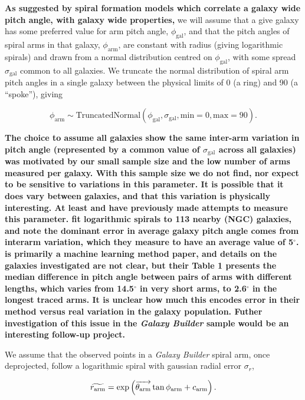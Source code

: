 \textbf{As suggested by spiral formation models which correlate a galaxy wide pitch angle, with galaxy wide properties,} we will assume that a give galaxy has some preferred value for arm pitch angle, $\phi_\mathrm{gal}$, and that the pitch angles of spiral arms in that galaxy, $\phi_\mathrm{arm}$, are constant with radius (giving logarithmic spirals) and drawn from a normal distribution centred on $\phi_\mathrm{gal}$, with some spread $\sigma_\mathrm{gal}$ common to all galaxies. We truncate the normal distribution of spiral arm pitch angles in a single galaxy between the physical limits of {0\degree} (a ring) and {90\degree} (a ``spoke''), giving

\begin{equation}
\phi_\mathrm{arm} \sim \mathrm{TruncatedNormal}(\phi_\mathrm{gal}, \sigma_\mathrm{gal}, \mathrm{min}=0, \mathrm{max}=90).
\end{equation}

\textbf{The choice to assume all galaxies show the same inter-arm variation in pitch angle (represented by a common value of $\sigma_\mathrm{gal}$ across all galaxies) was motivated by our small sample size and the low number of arms measured per galaxy. With this sample size we do not find, nor expect to be sensitive to variations in this parameter. It is possible that it does vary between galaxies, and that this variation is physically interesting. At least \citet{1981AJ.....86.1847K} and \citet{2014ApJ...790...87D} have previously made attempts to measure this parameter.  \citet{1981AJ.....86.1847K} fit logarithmic spirals to 113 nearby (NGC) galaxies, and note the dominant error in average galaxy pitch angle comes from interarm variation, which they measure to have an average value of 5$^\circ$. \citet{2014ApJ...790...87D} is primarily a machine learning method paper, and details on the galaxies investigated are not clear, but their Table 1 presents the median difference in pitch angle between pairs of arms with different lengths, which varies from 14.5$^\circ$ in very short arms, to 2.6$^\circ$ in the longest traced arms. It is unclear how much this encodes error in their method versus real variation in the galaxy population. Futher investigation of this issue in the \textit{Galaxy Builder} sample would be an interesting follow-up project.}

We assume that the observed points in a \textit{Galaxy Builder} spiral arm, once deprojected, follow a logarithmic spiral with gaussian radial error $\sigma_r$,

\begin{equation}
\widetilde{r_\mathrm{arm}} = \exp\left(\overrightarrow{\theta_\mathrm{arm}}\tan\phi_\mathrm{arm} + c_\mathrm{arm}\right).
\end{equation}

